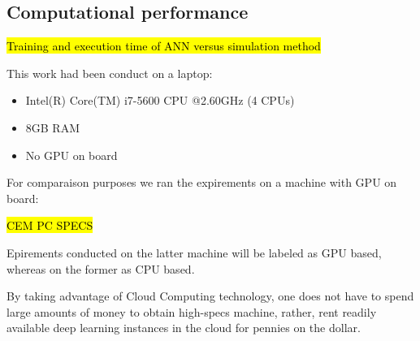 \documentclass[draft, a4, 10pt, onecolumn]{IEEEtran}
\begin{document}
\subsection{Computational performance}

\hl{Training and execution time of ANN versus simulation method}


This work had been conduct on a  laptop: 

\begin{itemize}
\item Intel(R) Core(TM) i7-5600 CPU @2.60GHz (4 CPUs)
\item 8GB RAM
\item No GPU on board
\end{itemize}

For comparaison purposes we ran the expirements on a machine with GPU on board:

\hl{CEM PC SPECS}

Epirements conducted on the latter machine will be labeled as GPU based, whereas on the former as CPU based.

By taking advantage of Cloud Computing technology, one does not have to spend large amounts of money to obtain high-specs machine, rather, rent readily available deep learning instances in the cloud for pennies on the dollar. 
\end{document}
